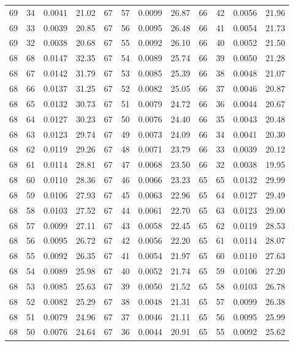 \begin{tabular}{llll|llll|llll}
69 & 34 & 0.0041 & 21.02 & 67 & 57 & 0.0099 & 26.87 & 66 & 42 & 0.0056 & 21.96\\
69 & 33 & 0.0039 & 20.85 & 67 & 56 & 0.0095 & 26.48 & 66 & 41 & 0.0054 & 21.73\\
69 & 32 & 0.0038 & 20.68 & 67 & 55 & 0.0092 & 26.10 & 66 & 40 & 0.0052 & 21.50\\
68 & 68 & 0.0147 & 32.35 & 67 & 54 & 0.0089 & 25.74 & 66 & 39 & 0.0050 & 21.28\\
68 & 67 & 0.0142 & 31.79 & 67 & 53 & 0.0085 & 25.39 & 66 & 38 & 0.0048 & 21.07\\
68 & 66 & 0.0137 & 31.25 & 67 & 52 & 0.0082 & 25.05 & 66 & 37 & 0.0046 & 20.87\\
68 & 65 & 0.0132 & 30.73 & 67 & 51 & 0.0079 & 24.72 & 66 & 36 & 0.0044 & 20.67\\
68 & 64 & 0.0127 & 30.23 & 67 & 50 & 0.0076 & 24.40 & 66 & 35 & 0.0043 & 20.48\\
68 & 63 & 0.0123 & 29.74 & 67 & 49 & 0.0073 & 24.09 & 66 & 34 & 0.0041 & 20.30\\
68 & 62 & 0.0119 & 29.26 & 67 & 48 & 0.0071 & 23.79 & 66 & 33 & 0.0039 & 20.12\\
68 & 61 & 0.0114 & 28.81 & 67 & 47 & 0.0068 & 23.50 & 66 & 32 & 0.0038 & 19.95\\
68 & 60 & 0.0110 & 28.36 & 67 & 46 & 0.0066 & 23.23 & 65 & 65 & 0.0132 & 29.99\\
68 & 59 & 0.0106 & 27.93 & 67 & 45 & 0.0063 & 22.96 & 65 & 64 & 0.0127 & 29.49\\
68 & 58 & 0.0103 & 27.52 & 67 & 44 & 0.0061 & 22.70 & 65 & 63 & 0.0123 & 29.00\\
68 & 57 & 0.0099 & 27.11 & 67 & 43 & 0.0058 & 22.45 & 65 & 62 & 0.0119 & 28.53\\
68 & 56 & 0.0095 & 26.72 & 67 & 42 & 0.0056 & 22.20 & 65 & 61 & 0.0114 & 28.07\\
68 & 55 & 0.0092 & 26.35 & 67 & 41 & 0.0054 & 21.97 & 65 & 60 & 0.0110 & 27.63\\
68 & 54 & 0.0089 & 25.98 & 67 & 40 & 0.0052 & 21.74 & 65 & 59 & 0.0106 & 27.20\\
68 & 53 & 0.0085 & 25.63 & 67 & 39 & 0.0050 & 21.52 & 65 & 58 & 0.0103 & 26.78\\
68 & 52 & 0.0082 & 25.29 & 67 & 38 & 0.0048 & 21.31 & 65 & 57 & 0.0099 & 26.38\\
68 & 51 & 0.0079 & 24.96 & 67 & 37 & 0.0046 & 21.11 & 65 & 56 & 0.0095 & 25.99\\
68 & 50 & 0.0076 & 24.64 & 67 & 36 & 0.0044 & 20.91 & 65 & 55 & 0.0092 & 25.62\\

\end{tabular}
